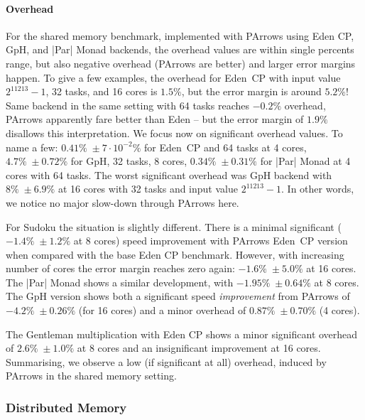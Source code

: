 \paragraph{Overhead}

For the shared memory \rmtest benchmark, implemented with PArrows using Eden CP, GpH, and |Par| Monad backends, the overhead values are within single percents range, but also negative overhead (\ie PArrows are better) and larger error margins happen. To give a few examples, the overhead for Eden~CP with input value $2^{11213}-1$, 32 tasks, and 16 cores is $1.5\%$, but the error margin is around $5.2\%$! Same backend in the same setting with 64 tasks reaches $-0.2\%$ overhead, PArrows apparently fare better than Eden -- but the error margin of $1.9\%$ disallows this interpretation. We focus now on significant overhead values. To name a few: $0.41\%\; \pm 7\cdot 10^{-2}\%$ for Eden~CP and 64 tasks at 4 cores, $4.7\% \; \pm 0.72\%$ for GpH, 32 tasks, 8 cores, $0.34\% \; \pm 0.31\%$ for |Par| Monad at 4 cores with 64 tasks. The worst significant overhead was  GpH backend with $8\% \; \pm 6.9\%$ at 16 cores with 32 tasks and input value $2^{11213}-1$. In other words, we notice no major slow-down through PArrows here.

For Sudoku the situation is slightly different. There is a minimal significant ($-1.4\% \; \pm 1.2\%$ at 8 cores) speed improvement with PArrows Eden~CP version when compared with the base Eden CP benchmark. However, with increasing number of cores the error margin reaches zero again: $-1.6\% \; \pm 5.0\%$ at 16 cores. The |Par| Monad shows a similar development, \eg with $-1.95\% \; \pm 0.64\%$ at 8 cores. The GpH version shows both a significant speed \textit{improvement} from PArrows of $-4.2\% \; \pm 0.26\%$ (for 16 cores) and a minor overhead of $0.87\% \; \pm 0.70\%$ (4 cores).

The Gentleman multiplication with Eden CP shows a minor significant overhead of $2.6\% \; \pm 1.0\%$ at 8 cores and an insignificant improvement at 16 cores. Summarising, we observe a low (if significant at all) overhead, induced by PArrows in the shared memory setting.

\subsubsection{Distributed Memory}

